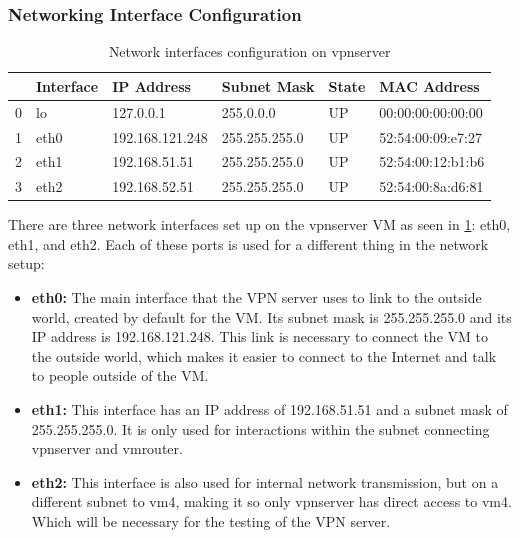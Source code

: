 \documentclass[12pt, fleqn, a4paper]{article}
\begin{document}
\subsubsection{Networking Interface Configuration}
\begin{table}[H]
	\caption{Network interfaces configuration on vpnserver}
	\centering
\begin{tabular}{llllll}
\toprule
{} & Interface &       IP Address &    Subnet Mask & State &        MAC Address \\
\midrule
0 &        lo &        127.0.0.1 &      255.0.0.0 &    UP &  00:00:00:00:00:00 \\
1 &      eth0 &  192.168.121.248 &  255.255.255.0 &    UP &  52:54:00:09:e7:27 \\
2 &      eth1 &    192.168.51.51 &  255.255.255.0 &    UP &  52:54:00:12:b1:b6 \\
3 &      eth2 &    192.168.52.51 &  255.255.255.0 &    UP &  52:54:00:8a:d6:81 \\
\bottomrule
\end{tabular}
  \label{tab:vpnserver1}
\end{table}
There are three network interfaces set up on the vpnserver VM as seen in \cref{tab:vpnserver1}: eth0, eth1, and eth2. Each of these ports is used for a different thing in the network setup:
\begin{itemize}
  \item \textbf{eth0:} The main interface that the VPN server uses to link to the outside world, created by default for the VM. Its subnet mask is 255.255.255.0 and its IP address is 192.168.121.248. This link is necessary to connect the VM to the outside world, which makes it easier to connect to the Internet and talk to people outside of the VM.
  \item \textbf{eth1:} This interface has an IP address of 192.168.51.51 and a subnet mask of 255.255.255.0. It is only used for interactions within the subnet connecting vpnserver and vmrouter.
  \item \textbf{eth2:} This interface is also used for internal network transmission, but on a different subnet to vm4, making it so only vpnserver has direct access to vm4. Which will be necessary for the testing of the VPN server.
\end{itemize}
\end{document}
